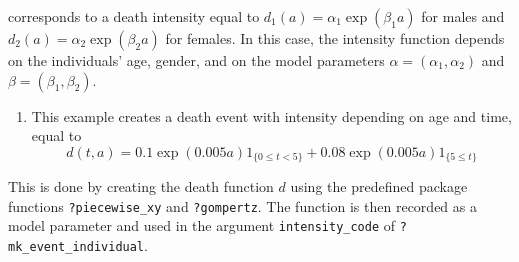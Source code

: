 corresponds to a death intensity equal to \(d_1(a) = \alpha_1 \exp(\beta_1 a)\) for males and \(d_2(a) = \alpha_2 \exp(\beta_2 a)\) for females. In this case, the intensity function depends on the individuals' age, gender, and on the model parameters \(\alpha = (\alpha_1, \alpha_2)\) and \(\beta = (\beta_1, \beta_2)\).

\begin{enumerate}
\def\labelenumi{\arabic{enumi}.}
\setcounter{enumi}{1}
\tightlist
\item
  This example creates a death event with intensity depending on age and time, equal to
  \begin{equation*}
  d(t,a) = 0.1\exp(0.005a) 1_{\{0\leq t <5\}} + 0.08\exp(0.005a) 1_{\{5\leq t\}}
  \end{equation*}
\end{enumerate}

This is done by creating the death function \(d\) using the predefined package functions \texttt{?piecewise\_xy} and \texttt{?gompertz}. The function is then recorded as a model parameter and used in the argument \texttt{intensity\_code} of \texttt{?mk\_event\_individual}.

\begin{Shaded}
\begin{Highlighting}[]
\StringTok{ }\NormalTok{(}\NormalTok{(}\NormalTok{),}
                                  \NormalTok{(}\NormalTok{(}\NormalTok{,}\NormalTok{),}
                                       \NormalTok{(}\NormalTok{,}\NormalTok{)))}
\NormalTok{(}\NormalTok{, }\NormalTok{) }
\StringTok{ }\NormalTok{(}\NormalTok{=}\StringTok{ }

\StringTok{ }\NormalTok{(} \NormalTok{,}
                     \NormalTok{)}
\end{Highlighting}
\end{Shaded}

